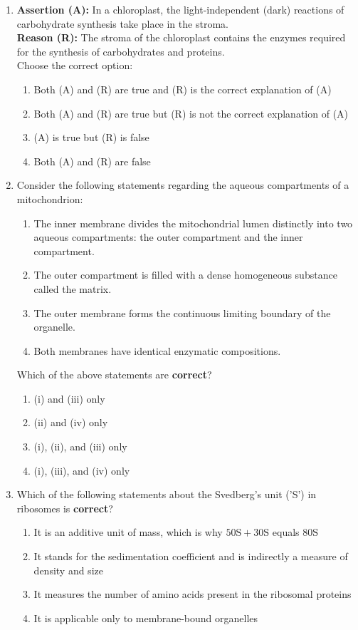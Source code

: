 \documentclass[11pt, a4paper]{article}
\begin{document}
\begin{enumerate}[label=\textbf{\arabic*.}, leftmargin=*, itemsep=8pt]
    \item \textbf{Assertion (A):} In a chloroplast, the light-independent (dark) reactions of carbohydrate synthesis take place in the stroma.\\
    \textbf{Reason (R):} The stroma of the chloroplast contains the enzymes required for the synthesis of carbohydrates and proteins.\\
    Choose the correct option:
    \begin{enumerate}[label=(\alph*)]
        \item Both (A) and (R) are true and (R) is the correct explanation of (A)
        \item Both (A) and (R) are true but (R) is not the correct explanation of (A)
        \item (A) is true but (R) is false
        \item Both (A) and (R) are false
    \end{enumerate}

    \item Consider the following statements regarding the aqueous compartments of a mitochondrion:
    \begin{enumerate}[label=(\roman*)]
        \item The inner membrane divides the mitochondrial lumen distinctly into two aqueous compartments: the outer compartment and the inner compartment.
        \item The outer compartment is filled with a dense homogeneous substance called the matrix.
        \item The outer membrane forms the continuous limiting boundary of the organelle.
        \item Both membranes have identical enzymatic compositions.
    \end{enumerate}
    Which of the above statements are \textbf{correct}?
    \begin{enumerate}[label=(\alph*)]
        \item (i) and (iii) only
        \item (ii) and (iv) only
        \item (i), (ii), and (iii) only
        \item (i), (iii), and (iv) only
    \end{enumerate}

    \item Which of the following statements about the Svedberg's unit ('S') in ribosomes is \textbf{correct}?
    \begin{enumerate}[label=(\alph*)]
        \item It is an additive unit of mass, which is why $50\text{S} + 30\text{S}$ equals $80\text{S}$
        \item It stands for the sedimentation coefficient and is indirectly a measure of density and size
        \item It measures the number of amino acids present in the ribosomal proteins
        \item It is applicable only to membrane-bound organelles
    \end{enumerate}


\end{enumerate}
\end{document}
